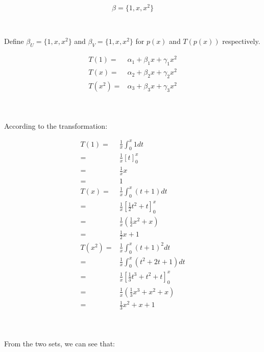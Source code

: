 \documentclass{article}
\begin{document}
~

$$
\beta=\{1,x,x^2\}
$$

~

Define $\beta_U=\{1,x,x^2\}$ and $\beta_V=\{1,x,x^2\}$ for $p(x)$ and $T(p(x))$ respectively.

\begin{equation*}
\begin{split}
T(1)=&\alpha_1+\beta_1 x+\gamma_1 x^2\\
T(x)=&\alpha_2+\beta_2 x+\gamma_2 x^2\\
T(x^2)=&\alpha_3+\beta_3 x+\gamma_3 x^2\\
\end{split}
\end{equation*}

~

According to the transformation:

\begin{equation*}
\begin{split}
T(1)=& \frac{1}{x}\int^x_0 1dt\\
=&\frac{1}{x}\left[t\right]^x_0\\
=&\frac{1}{x}x\\
=&1\\
T(x)=&\frac{1}{x}\int^x_0 (t+1)dt\\
=&\frac{1}{x}\left[\frac{1}{2}t^2+t\right]^x_0\\
=&\frac{1}{x}(\frac{1}{2}x^2+x)\\
=&\frac{1}{2}x+1\\
T(x^2)=&\frac{1}{x}\int^x_0(t+1)^2dt\\
=&\frac{1}{x}\int^x_0(t^2+2t+1)dt\\
=&\frac{1}{x}\left[\frac{1}{3}t^3+t^2+t\right]^x_0\\
=&\frac{1}{x}(\frac{1}{3}x^3+x^2+x)\\
=&\frac{1}{3}x^2+x+1\\
\end{split}
\end{equation*}

~

From the two sets, we can see that:
\end{document}
